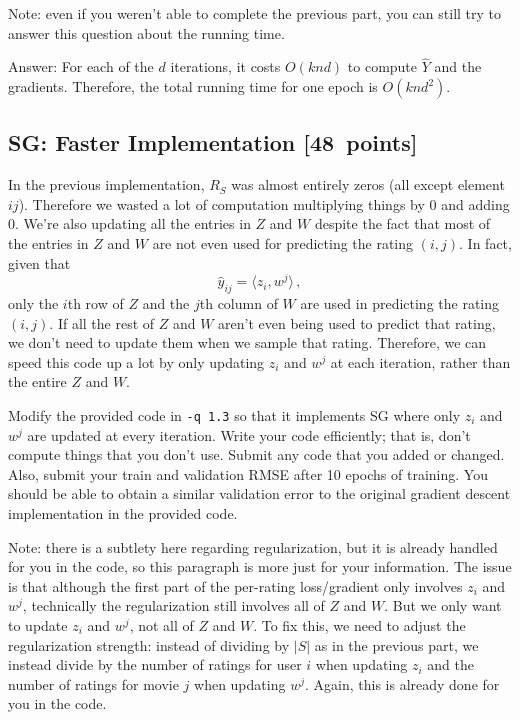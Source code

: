 \documentclass{article}
\newcommand{\blu}[1]{{\textcolor{blu}{#1}}}
\newenvironment{answer}{\par\begingroup\color{gre}Answer: }{\endgroup}
\let\ask\blu
\newcommand\pts[1]{\textcolor{pointscolour}{[#1~points]}}
\begin{document}
Note: even if you weren't able to complete the previous part, you can still try to answer this question about the running time.


\begin{answer}
    For each of the $d$ iterations, it costs $O(knd)$ to compute $\hat Y$ and the gradients.
    Therefore, the total running time for one epoch is $O(knd^2)$.
\end{answer}


\clearpage
\subsection{SG: Faster Implementation \pts{48}}

In the previous implementation, $R_S$ was almost entirely zeros (all except element $ij$). Therefore we wasted a lot of computation multiplying things by 0 and adding 0. We're also updating all the entries in $Z$ and $W$ despite the fact that most of the entries in $Z$ and $W$ are not even used for predicting the rating $(i,j)$. In fact, given that
\[
\hat{y}_{ij} = \langle z_i, w^j \rangle \, ,
\]
only the $i$th row of $Z$ and the $j$th column of $W$ are used in predicting the rating $(i,j)$. If all the rest of $Z$ and $W$ aren't even being used to predict that rating, we don't need to update them when we sample that rating. Therefore, we can speed this code up a lot by only updating $z_i$ and $w^j$ at each iteration, rather than the entire $Z$ and $W$.


\ask{Modify the provided code in \texttt{-q 1.3} so that it implements SG where only $z_i$ and $w^j$ are updated at every iteration. Write your code efficiently; that is, don't compute things that you don't use. Submit any code that you added or changed. Also, submit your train and validation RMSE after 10 epochs of training.} You should be able to obtain a similar validation error to the original gradient descent implementation in the provided code.

Note: there is a subtlety here regarding regularization, but it is already handled for you in the code, so this paragraph is more just for your information. The issue is that although the first part of the per-rating loss/gradient only involves $z_i$ and $w^j$, technically the regularization still involves all of $Z$ and $W$. But we only want to update $z_i$ and $w^j$, not all of $Z$ and $W$. To fix this, we need to adjust the regularization strength: instead of dividing by $|S|$ as in the previous part, we instead divide by the number of ratings for user $i$ when updating $z_i$ and the number of ratings for movie $j$ when updating $w^j$. Again, this is already done for you in the code.
\end{document}
